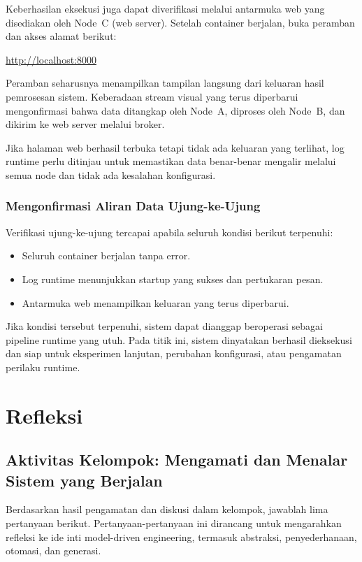 Keberhasilan eksekusi juga dapat diverifikasi melalui antarmuka web yang
disediakan oleh Node~C (web server). Setelah container berjalan, buka peramban dan
akses alamat berikut:

\url{http://localhost:8000}

Peramban seharusnya menampilkan tampilan langsung dari keluaran hasil pemrosesan
sistem. Keberadaan stream visual yang terus diperbarui mengonfirmasi bahwa data
ditangkap oleh Node~A, diproses oleh Node~B, dan dikirim ke web server melalui
broker.

Jika halaman web berhasil terbuka tetapi tidak ada keluaran yang terlihat, log
runtime perlu ditinjau untuk memastikan data benar-benar mengalir melalui semua
node dan tidak ada kesalahan konfigurasi.

\subsubsection{Mengonfirmasi Aliran Data Ujung-ke-Ujung}

Verifikasi ujung-ke-ujung tercapai apabila seluruh kondisi berikut terpenuhi:

\begin{itemize}
  \item Seluruh container berjalan tanpa error.
  \item Log runtime menunjukkan startup yang sukses dan pertukaran pesan.
  \item Antarmuka web menampilkan keluaran yang terus diperbarui.
\end{itemize}

Jika kondisi tersebut terpenuhi, sistem dapat dianggap beroperasi sebagai pipeline
runtime yang utuh. Pada titik ini, sistem dinyatakan berhasil dieksekusi dan siap
untuk eksperimen lanjutan, perubahan konfigurasi, atau pengamatan perilaku runtime.

\section{Refleksi}

\subsection[Aktivitas Kelompok]{Aktivitas Kelompok: Mengamati dan Menalar Sistem yang Berjalan}

Berdasarkan hasil pengamatan dan diskusi dalam kelompok, jawablah lima
pertanyaan berikut. Pertanyaan-pertanyaan ini dirancang untuk mengarahkan refleksi
ke ide inti model-driven engineering, termasuk abstraksi, penyederhanaan,
otomasi, dan generasi.

